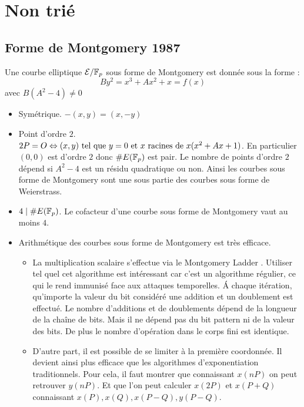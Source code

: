 \documentclass[a4paper]{report}
\begin{document}
\chapter{Non trié}
\section{Forme de Montgomery 1987}
\begin{definition}
Une courbe elliptique $\mathcal{E} / \mathbb{F}_{p}$ sous forme de Montgomery est donnée sous la forme :
\begin{equation}
By^2 = x^3 + Ax^2 + x =f(x)
\end{equation}
avec $B(A^2 - 4) \neq 0$
\end{definition}
\begin{itemize}[label=$\bullet$]
    \item Symétrique. $-(x, y) = (x, -y)$
    \item Point d'ordre $2$. $2P = O{} \Leftrightarrow (x, y) \text{ tel que } y = 0 \text{ et } x \text{ racines de } x(x^2 + Ax + 1)$. En particulier $(0, 0)$ est d'ordre $2$ donc $\# E(\mathbb{F}_{p})$ est pair. Le nombre de points d'ordre $2$ dépend si $A^2-4$ est un résidu quadratique ou non. Ainsi les courbes sous forme de Montgomery sont une sous partie des courbes sous forme de Weierstrass. 
    \item $4 \mid \# E(\mathbb{F}_{p})$. Le cofacteur d'une courbe sous forme de Montgomery vaut au moins $4$.
    \item Arithmétique des courbes sous forme de Montgomery est très efficace. 
    \begin{itemize}[label=--]
        \item La multiplication scalaire s'effectue via le Montgomery Ladder . Utiliser tel quel cet algorithme est intéressant car c'est un algorithme régulier, ce qui le rend immunisé face aux attaques temporelles. \'{A} chaque itération, qu'importe la valeur du bit considéré une addition et un doublement est effectué. Le nombre d'additions et de doublements dépend de la longueur de la chaîne de bits. Mais il ne dépend pas du bit pattern ni de la valeur des bits. De plus le nombre d'opération dans le corps fini est identique.
        \item D'autre part, il est possible de se limiter à la première coordonnée. Il devient ainsi plus efficace que les algorithmes d'exponentiation traditionnels. Pour cela, il faut montrer que connaissant $x(nP)$ on peut retrouver $y(nP)$. Et que l'on peut calculer $x(2P)$ et $x(P+Q)$ connaissant $x(P), x(Q), x(P-Q), y(P-Q)$.

\end{itemize}
\end{itemize}
\end{document}

